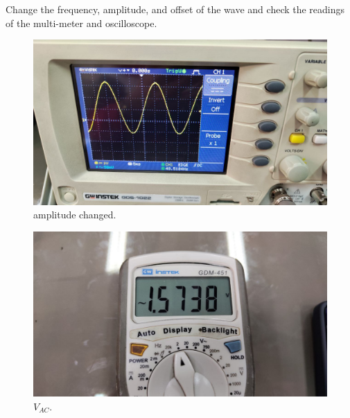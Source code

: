 \documentclass[11pt]{article}
\newcommand{\PicScale}{0.2}
\begin{document}
\begin{question}
\begin{subquestion}{Change the frequency, amplitude, and offset of the wave and check the readings of the multi-meter and oscilloscope.}
{            \begin{figure}[H]
                \begin{center}
                    \includegraphics[scale=\PicScale]{Fig/24.jpeg}
                    \caption{amplitude changed.}
                \end{center}
            \end{figure}
            \begin{figure}[H]
                \begin{center}
                    \includegraphics[scale=\PicScale]{Fig/25.jpeg}
                    \caption{$V_{AC}$.}
                \end{center}
            \end{figure}

}
\end{subquestion}
\end{question}
\end{document}
